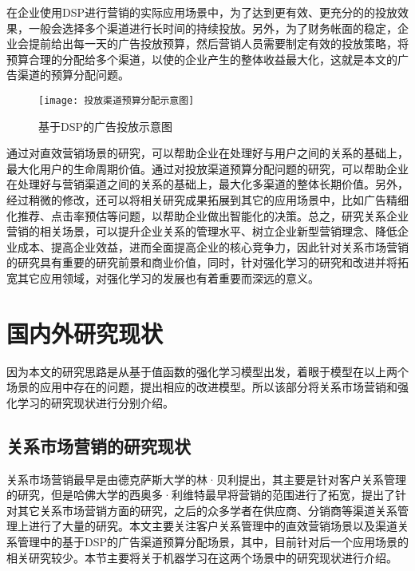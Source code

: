 在企业使用DSP进行营销的实际应用场景中，为了达到更有效、更充分的的投放效果，一般会选择多个渠道进行长时间的持续投放。另外，为了财务帐面的稳定，企业会提前给出每一天的广告投放预算，然后营销人员需要制定有效的投放策略，将预算合理的分配给多个渠道，以使的企业产生的整体收益最大化，这就是本文的广告渠道的预算分配问题。
\begin{figure}[htbp]
\centering
\texttt{[image: 投放渠道预算分配示意图]}
\caption{基于DSP的广告投放示意图}
\label{fig:广告渠道预算分配示意图}
\end{figure}

通过对直效营销场景的研究，可以帮助企业在处理好与用户之间的关系的基础上，最大化用户的生命周期价值。通过对投放渠道预算分配问题的研究，可以帮助企业在处理好与营销渠道之间的关系的基础上，最大化多渠道的整体长期价值。另外，经过稍微的修改，还可以将相关研究成果拓展到其它的应用场景中，比如广告精细化推荐、点击率预估等问题，以帮助企业做出智能化的决策。总之，研究关系企业营销的相关场景，可以提升企业关系的管理水平、树立企业新型营销理念、降低企业成本、提高企业效益，进而全面提高企业的核心竞争力，因此针对关系市场营销的研究具有重要的研究前景和商业价值，同时，针对强化学习的研究和改进并将拓宽其它应用领域，对强化学习的发展也有着重要而深远的意义。

\section{国内外研究现状}
因为本文的研究思路是从基于值函数的强化学习模型出发，着眼于模型在以上两个场景的应用中存在的问题，提出相应的改进模型。所以该部分将关系市场营销和强化学习的研究现状进行分别介绍。

\subsection{关系市场营销的研究现状}
关系市场营销最早是由德克萨斯大学的林·贝利提出，其主要是针对客户关系管理的研究，但是哈佛大学的西奥多·利维特最早将营销的范围进行了拓宽，提出了针对其它关系市场营销方面的研究，之后的众多学者在供应商、分销商等渠道关系管理上进行了大量的研究。本文主要关注客户关系管理中的直效营销场景以及渠道关系管理中的基于DSP的广告渠道预算分配场景，其中，目前针对后一个应用场景的相关研究较少。本节主要将关于机器学习在这两个场景中的研究现状进行介绍。


